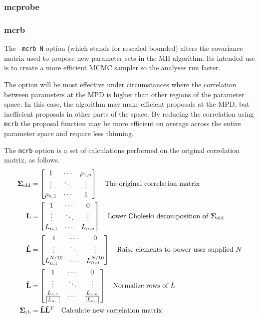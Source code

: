 \documentclass{article}\usepackage[]{graphicx}\usepackage[]{color}
\begin{document}
\subsubsection{mcprobe}

\subsubsection{mcrb}
The \texttt{-mcrb N} option (which stands for rescaled
bounded) alters the covariance matrix used to propose new
parameter sets in the MH algorithm. Its intended use is to
create a more efficient MCMC sampler so the analyses run
faster. 

The option will be most effective under circumstances where
the correlation between parameters at the MPD is higher than
other regions of the parameter space. In this case, the
algorithm may make efficient proposals at the MPD, but
inefficient proposals in other parts of the space. By
reducing the correlation using \texttt{mcrb} the proposal
function may be more efficient on average across the entire
parameter space and require less thinning.


The \texttt{mcrb} option is a set of calculations performed
on the original correlation matrix, as follows.
\begin{align*}
  \mathbf{\Sigma_{\text{old}}}&=
  \begin{bmatrix}
    1 & \cdots & \rho_{1,n}\\
    \vdots & \ddots & \vdots\\
    \rho_{n,1} & \cdots & 1
  \end{bmatrix}
  \quad\text{The original correlation matrix}\\
  \mathbf{L}&=\begin{bmatrix}
    1 & \cdots & 0\\
    \vdots & \ddots & \vdots\\
    L_{n,1} & \cdots & L_{n,n}
  \end{bmatrix}
  \quad\text{Lower Choleski decomposition of $ \mathbf{\Sigma_{\text{old}}}$}\\
  \mathbf{\hat{L}}&=\begin{bmatrix}
    1 & \cdots & 0\\
    \vdots & \ddots & \vdots\\
    L_{n,1}^{N/10} & \cdots & L_{n,n}^{N/10}
  \end{bmatrix}
  \quad\text{Raise elements to power user supplied $N$}\\
  \mathbf{\tilde{L}}&=\begin{bmatrix}
    1 & \cdots & 0\\
    \vdots & \ddots & \vdots\\
    \frac{\hat{L}_{n,1}}{\left | \hat{L}_{n,\cdot}\right |} & \cdots &
    \frac{\hat{L}_{n,n}}{\left | \hat{L}_{n,\cdot}\right |}
  \end{bmatrix}
  \quad\text{Normalize rows of $\hat{L}$ }\\
  \mathbf{\Sigma_{\text{rb}}}&=\mathbf{\tilde{L}}\mathbf{\tilde{L}}^T
  \quad\text{Calculate new correlation matrix}
\end{align*}
\end{document}
